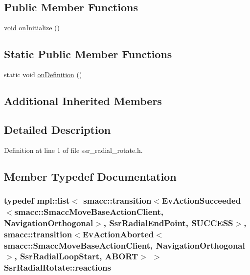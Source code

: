 \subsection*{Public Member Functions}
\begin{DoxyCompactItemize}
\item 
void \hyperlink{structSsrRadialRotate_a91b3de3b25e4cf0d3a672f6ea344abea}{on\+Initialize} ()
\end{DoxyCompactItemize}
\subsection*{Static Public Member Functions}
\begin{DoxyCompactItemize}
\item 
static void \hyperlink{structSsrRadialRotate_a96e76900952f342ee6591b84168f927f}{on\+Definition} ()
\end{DoxyCompactItemize}
\subsection*{Additional Inherited Members}


\subsection{Detailed Description}


Definition at line 1 of file ssr\+\_\+radial\+\_\+rotate.\+h.



\subsection{Member Typedef Documentation}
\subsubsection[{\texorpdfstring{reactions}{reactions}}]{\setlength{\rightskip}{0pt plus 5cm}typedef mpl\+::list$<$ {\bf smacc\+::transition}$<$Ev\+Action\+Succeeded$<${\bf smacc\+::\+Smacc\+Move\+Base\+Action\+Client}, {\bf Navigation\+Orthogonal}$>$, {\bf Ssr\+Radial\+End\+Point}, {\bf S\+U\+C\+C\+E\+SS}$>$, {\bf smacc\+::transition}$<$Ev\+Action\+Aborted$<${\bf smacc\+::\+Smacc\+Move\+Base\+Action\+Client}, {\bf Navigation\+Orthogonal}$>$, {\bf Ssr\+Radial\+Loop\+Start}, {\bf A\+B\+O\+RT}$>$ $>$ {\bf Ssr\+Radial\+Rotate\+::reactions}}\hypertarget{structSsrRadialRotate_a7470f9e6ce585a02891eb9202e55de9a}{}\label{structSsrRadialRotate_a7470f9e6ce585a02891eb9202e55de9a}


